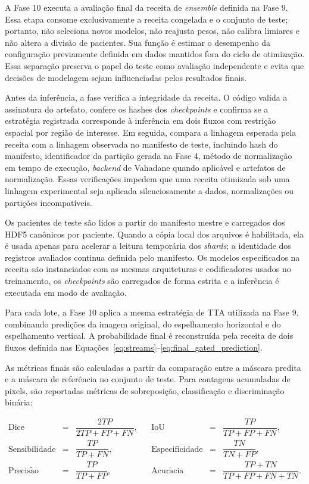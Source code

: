 A Fase 10 executa a avaliação final da receita de \textit{ensemble} definida na
Fase 9. Essa etapa consome exclusivamente a receita congelada e o conjunto de
teste; portanto, não seleciona novos modelos, não reajusta pesos, não calibra
limiares e não altera a divisão de pacientes. Sua função é estimar o desempenho
da configuração previamente definida em dados mantidos fora do ciclo de
otimização. Essa separação preserva o papel do teste como avaliação independente
e evita que decisões de modelagem sejam influenciadas pelos resultados finais.

Antes da inferência, a fase verifica a integridade da receita. O código valida a
assinatura do artefato, confere os hashes dos \textit{checkpoints} e confirma se
a estratégia registrada corresponde à inferência em dois fluxos com restrição
espacial por região de interesse. Em seguida, compara a
linhagem esperada pela receita com a linhagem observada no manifesto de teste,
incluindo hash do manifesto, identificador da partição gerada na Fase 4, método
de normalização em tempo de execução, \textit{backend} de Vahadane quando
aplicável e artefatos de normalização. Essas verificações impedem que uma
receita otimizada sob uma linhagem experimental seja aplicada silenciosamente a
dados, normalizações ou partições incompatíveis.

Os pacientes de teste são lidos a partir do manifesto mestre e
carregados dos HDF5 canônicos por paciente. Quando a cópia local dos arquivos é
habilitada, ela é usada apenas para acelerar a leitura temporária dos
\textit{shards}; a identidade dos registros avaliados continua definida pelo
manifesto. Os modelos especificados na receita são instanciados com as mesmas
arquiteturas e codificadores usados no treinamento, os \textit{checkpoints} são
carregados de forma estrita e a inferência é executada em modo de avaliação.

Para cada lote, a Fase 10 aplica a mesma estratégia de TTA utilizada na
Fase 9, combinando predições da imagem original, do espelhamento horizontal e do
espelhamento vertical. A probabilidade final é reconstruída pela receita de
dois fluxos definida nas Equações~\ref{eq:streams}--\ref{eq:final_gated_prediction}.

As métricas finais são calculadas a partir da comparação entre a máscara predita
e a máscara de referência no conjunto de teste. Para contagens acumuladas de
pixels, são reportadas métricas de sobreposição, classificação e discriminação
binária:

\begin{equation}
\begin{array}{rclcrcl}
    \mathrm{Dice} &=& \dfrac{2TP}{2TP+FP+FN},
    &&
    \mathrm{IoU} &=& \dfrac{TP}{TP+FP+FN},\\[0.8em]
    \mathrm{Sensibilidade} &=& \dfrac{TP}{TP+FN},
    &&
    \mathrm{Especificidade} &=& \dfrac{TN}{TN+FP},\\[0.8em]
    \mathrm{Precis\tilde{a}o} &=& \dfrac{TP}{TP+FP},
    &&
    \mathrm{Acur\acute{a}cia} &=& \dfrac{TP+TN}{TP+FP+FN+TN}.
\end{array}
\label{eq:metricas_finais}
\end{equation}

